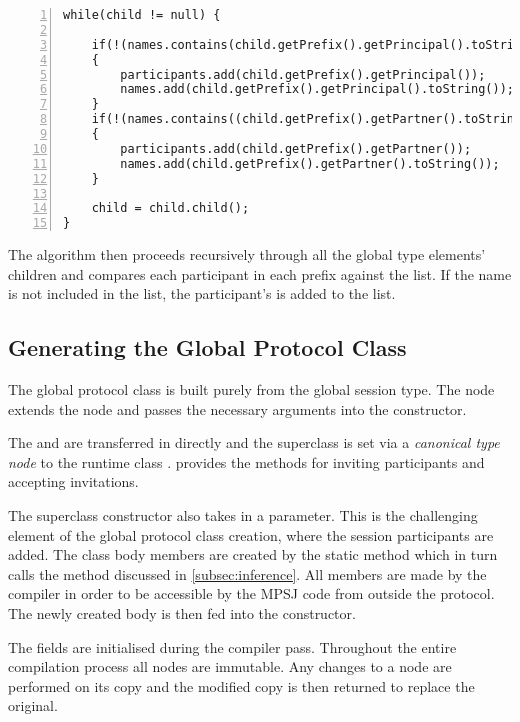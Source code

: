 \begin{lstlisting}[basicstyle=\LISTINGSTYLE, numbers=left]
while(child != null) {
			
	if(!(names.contains(child.getPrefix().getPrincipal().toString())))
	{
		participants.add(child.getPrefix().getPrincipal());
		names.add(child.getPrefix().getPrincipal().toString());
	}
	if(!(names.contains((child.getPrefix().getPartner().toString())))) 
	{
		participants.add(child.getPrefix().getPartner());
		names.add(child.getPrefix().getPartner().toString());
	}
	
	child = child.child();	
}
\end{lstlisting}

The algorithm then proceeds recursively through all the global type elements' children and compares each participant in each prefix against the  list. If the name is not included in the list, the participant's  is added to the list.


\subsection{Generating the Global Protocol Class}

The global protocol class is built purely from the global session type. The  node extends the  node and passes the necessary arguments into the  constructor.

The  and  are transferred in directly and the superclass is set via a \textit{canonical type node} to the runtime class .  provides the methods for inviting participants and accepting invitations.

The superclass constructor also takes in a  parameter. This is the challenging element of the global protocol class creation, where the session participants are added. The class body members are created by the static method  which in turn calls the  method discussed in \autoref{subsec:inference}. All members are made  by the compiler in order to be accessible by the MPSJ code from outside the protocol. The newly created body is then fed into the  constructor. 

The  fields are initialised during the  compiler pass. Throughout the entire compilation process all nodes are immutable. Any changes to a node are performed on its copy and the modified copy is then returned to replace the original.

